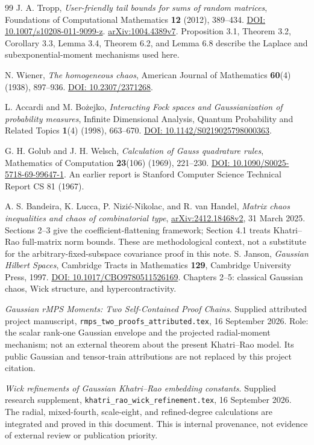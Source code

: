 \documentclass[11pt]{article}
\numberwithin{equation}{section}
\theoremstyle{definition}\newtheorem{definition}[theorem]{Definition}
\theoremstyle{remark}\newtheorem{remark}[theorem]{Remark}
\begin{document}
\begin{thebibliography}{99}
J. A. Tropp, \emph{User-friendly tail bounds for sums of random matrices},
Foundations of Computational Mathematics \textbf{12} (2012), 389--434.
\href{https://doi.org/10.1007/s10208-011-9099-z}{DOI: 10.1007/s10208-011-9099-z}.
\href{https://arxiv.org/abs/1004.4389v7}{arXiv:1004.4389v7}.
Proposition 3.1, Theorem 3.2, Corollary 3.3, Lemma 3.4, Theorem 6.2,
and Lemma 6.8 describe the Laplace and subexponential-moment mechanisms used here.

N. Wiener, \emph{The homogeneous chaos},
American Journal of Mathematics \textbf{60}(4) (1938), 897--936.
\href{https://doi.org/10.2307/2371268}{DOI: 10.2307/2371268}.

L. Accardi and M. Bo\.{z}ejko,
\emph{Interacting Fock spaces and Gaussianization of probability measures},
Infinite Dimensional Analysis, Quantum Probability and Related Topics
\textbf{1}(4) (1998), 663--670.
\href{https://doi.org/10.1142/S0219025798000363}{DOI: 10.1142/S0219025798000363}.

G. H. Golub and J. H. Welsch,
\emph{Calculation of Gauss quadrature rules},
Mathematics of Computation \textbf{23}(106) (1969), 221--230.
\href{https://doi.org/10.1090/S0025-5718-69-99647-1}{DOI: 10.1090/S0025-5718-69-99647-1}.
An earlier report is Stanford Computer Science Technical Report CS 81 (1967).

A. S. Bandeira, K. Lucca, P. Nizi\'c-Nikolac, and R. van Handel,
\emph{Matrix chaos inequalities and chaos of combinatorial type},
\href{https://arxiv.org/abs/2412.18468v2}{arXiv:2412.18468v2}, 31 March 2025.
Sections 2--3 give the coefficient-flattening framework; Section 4.1 treats
Khatri--Rao full-matrix norm bounds. These are methodological context, not a
substitute for the arbitrary-fixed-subspace covariance proof in this note.
S. Janson, \emph{Gaussian Hilbert Spaces}, Cambridge Tracts in Mathematics
\textbf{129}, Cambridge University Press, 1997.
\href{https://doi.org/10.1017/CBO9780511526169}{DOI: 10.1017/CBO9780511526169}.
Chapters 2--5: classical Gaussian chaos, Wick structure, and hypercontractivity.

\emph{Gaussian rMPS Moments: Two Self-Contained Proof Chains}.
Supplied attributed project manuscript,
\texttt{rmps\_two\_proofs\_attributed.tex}, 16 September 2026.
Role: the scalar rank-one Gaussian envelope and the projected radial-moment
mechanism; not an external theorem about the present Khatri--Rao model.
Its public Gaussian and tensor-train attributions are not replaced by this
project citation.

\emph{Wick refinements of Gaussian Khatri--Rao embedding constants}.
Supplied research supplement, \texttt{khatri\_rao\_wick\_refinement.tex},
16 September 2026. The radial, mixed-fourth, scale-eight, and refined-degree
calculations are integrated and proved in this document. This is internal
provenance, not evidence of external review or publication priority.

\end{thebibliography}
\end{document}
